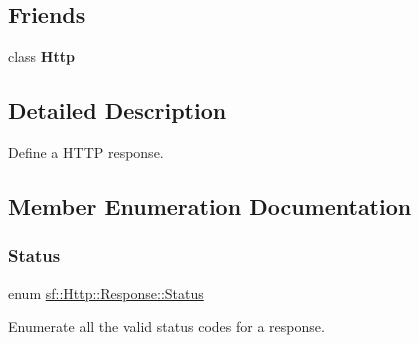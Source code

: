 \subsection*{Friends}
\begin{DoxyCompactItemize}
\item 
\mbox{\label{classsf_1_1_http_1_1_response_aba95e2a7762bb5df986048b05d03a22e}} 
class {\bfseries Http}
\end{DoxyCompactItemize}


\subsection{Detailed Description}
Define a H\+T\+TP response. 

\begin{DoxyVerb}\end{DoxyVerb}
 

\subsection{Member Enumeration Documentation}
\mbox{\label{classsf_1_1_http_1_1_response_a663e071978e30fbbeb20ed045be874d8}} 
\subsubsection{\texorpdfstring{Status}{Status}}
{\footnotesize\ttfamily enum \mbox{\hyperlink{classsf_1_1_http_1_1_response_a663e071978e30fbbeb20ed045be874d8}{sf\+::\+Http\+::\+Response\+::\+Status}}}



Enumerate all the valid status codes for a response. 

